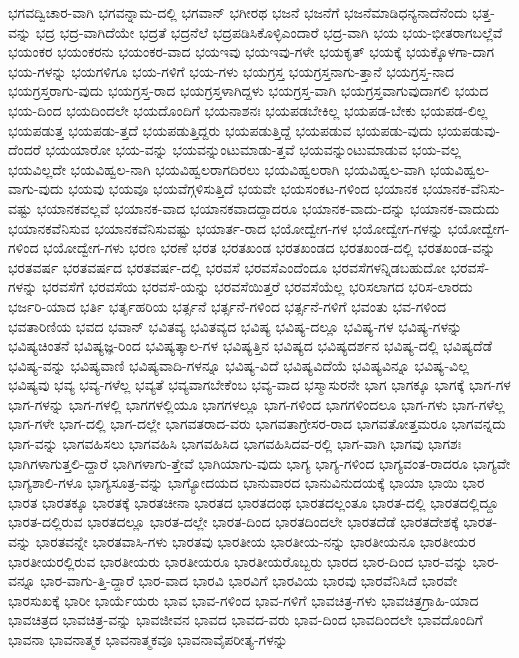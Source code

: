 {ಭಗವದ್ವಿಚಾರ-ವಾಗಿ
ಭಗವನ್ನಾಮ-ದಲ್ಲಿ
ಭಗವಾನ್
ಭಗೀರಥ
ಭಜನೆ
ಭಜನೆಗೆ
ಭಜನೆಮಾಡಿಧನ್ಯನಾದೆನೆಂದು
ಭತ್ತ-ವನ್ನು
ಭದ್ರ
ಭದ್ರ-ವಾಗಿದೆಯೇ
ಭದ್ರತೆ
ಭದ್ರನೆಲೆ
ಭದ್ರಪಡಿಸಿಕೊಳ್ಳಿಎಂದಾರೆ
ಭದ್ರ-ವಾಗಿ
ಭಯ
ಭಯ-ಭೀತರಾಗಬಲ್ಲೆವೆ
ಭಯಂಕರ
ಭಯಂಕರನು
ಭಯಂಕರ-ವಾದ
ಭಯಇವು
ಭಯಇವು-ಗಳೇ
ಭಯಕೃತ್
ಭಯಕ್ಕೆ
ಭಯಕ್ಕೊಳಗಾ-ದಾಗ
ಭಯ-ಗಳನ್ನು
ಭಯಗಳಿಗೂ
ಭಯ-ಗಳಿಗೆ
ಭಯ-ಗಳು
ಭಯಗ್ರಸ್ತ
ಭಯಗ್ರಸ್ತನಾಗು-ತ್ತಾನೆ
ಭಯಗ್ರಸ್ತ-ನಾದ
ಭಯಗ್ರಸ್ತರಾಗು-ವುದು
ಭಯಗ್ರಸ್ತ-ರಾದ
ಭಯಗ್ರಸ್ತಳಾಗಿದ್ದಳು
ಭಯಗ್ರಸ್ತ-ವಾಗಿ
ಭಯಗ್ರಸ್ತವಾಗುವುದಾಗಲಿ
ಭಯದ
ಭಯ-ದಿಂದ
ಭಯದಿಂದಲೇ
ಭಯದೊಂದಿಗೆ
ಭಯನಾಶನಃ
ಭಯಪಡಬೇಕಿಲ್ಲ
ಭಯಪಡ-ಬೇಕು
ಭಯಪಡ-ಲಿಲ್ಲ
ಭಯಪಡುತ್ತ
ಭಯಪಡು-ತ್ತದೆ
ಭಯಪಡುತ್ತಿದ್ದರು
ಭಯಪಡುತ್ತಿದ್ದೆ
ಭಯಪಡುವ
ಭಯಪಡು-ವುದು
ಭಯಪಡುವು-ದೆಂದರೆ
ಭಯಯಾರೋ
ಭಯ-ವನ್ನು
ಭಯವನ್ನುಂಟುಮಾಡು-ತ್ತವೆ
ಭಯವನ್ನುಂಟುಮಾಡುವ
ಭಯ-ವಲ್ಲ
ಭಯವಿಲ್ಲದೇ
ಭಯವಿಹ್ವಲ-ನಾಗಿ
ಭಯವಿಹ್ವಲರಾಗದಿರಲು
ಭಯವಿಹ್ವಲರಾಗಿ
ಭಯವಿಹ್ವಲ-ವಾಗಿ
ಭಯವಿಹ್ವಲ-ವಾಗು-ವುದು
ಭಯವು
ಭಯವೂ
ಭಯವೆಗ್ಗಳಿಸುತ್ತಿದೆ
ಭಯವೇ
ಭಯಸಂಕಟ-ಗಳಿಂದ
ಭಯಾನಕ
ಭಯಾನಕ-ವೆನಿಸು-ವಷ್ಟು
ಭಯಾನಕವಲ್ಲವೆ
ಭಯಾನಕ-ವಾದ
ಭಯಾನಕವಾದದ್ದಾದರೂ
ಭಯಾನಕ-ವಾದು-ದನ್ನು
ಭಯಾನಕ-ವಾದುದು
ಭಯಾನಕವೆನಿಸುವ
ಭಯಾನಕವೆನಿಸುವಷ್ಟು
ಭಯಾರ್ತ-ರಾದ
ಭಯೋದ್ವೇಗ-ಗಳ
ಭಯೋದ್ವೇಗ-ಗಳನ್ನು
ಭಯೋದ್ವೇಗ-ಗಳಿಂದ
ಭಯೋದ್ವೇಗ-ಗಳು
ಭರಣ
ಭರಣೆ
ಭರತ
ಭರತಖಂಡ
ಭರತಖಂಡದ
ಭರತಖಂಡ-ದಲ್ಲಿ
ಭರತಖಂಡ-ವನ್ನು
ಭರತವರ್ಷ
ಭರತವರ್ಷದ
ಭರತವರ್ಷ-ದಲ್ಲಿ
ಭರವಸೆ
ಭರವಸೆಎಂದೆಂದೂ
ಭರವಸೆಗಳನ್ನಿಡಬಹುದೋ
ಭರವಸೆ-ಗಳನ್ನು
ಭರವಸೆಗೆ
ಭರವಸೆಯ
ಭರವಸೆ-ಯನ್ನು
ಭರವಸೆಯಿತ್ತರೆ
ಭರವಸೆಯೆಲ್ಲ
ಭರಿಸಲಾಗದ
ಭರಿಸ-ಲಾರದು
ಭರ್ಜರಿ-ಯಾದ
ಭರ್ತಿ
ಭರ್ತೃಹರಿಯ
ಭರ್ತ್ಸನೆ
ಭರ್ತ್ಸನೆ-ಗಳಿಂದ
ಭರ್ತ್ಸನೆ-ಗಳಿಗೆ
ಭವಂತು
ಭವ-ಗಳಿಂದ
ಭವತಾರಿಣಿಯ
ಭವದ
ಭವಾನ್
ಭವಿತವ್ಯ
ಭವಿತವ್ಯದ
ಭವಿಷ್ಯ
ಭವಿಷ್ಯ-ದಲ್ಲೂ
ಭವಿಷ್ಯ-ಗಳ
ಭವಿಷ್ಯ-ಗಳನ್ನು
ಭವಿಷ್ಯಚಿಂತನೆ
ಭವಿಷ್ಯಜ್ಞ-ರಿಂದ
ಭವಿಷ್ಯತ್ಕಾಲ-ಗಳ
ಭವಿಷ್ಯತ್ತಿನ
ಭವಿಷ್ಯದ
ಭವಿಷ್ಯದರ್ಶನ
ಭವಿಷ್ಯ-ದಲ್ಲಿ
ಭವಿಷ್ಯದೆಡೆ
ಭವಿಷ್ಯ-ವನ್ನು
ಭವಿಷ್ಯವಾಣಿ
ಭವಿಷ್ಯವಾದಿ-ಗಳನ್ನೂ
ಭವಿಷ್ಯ-ವಿದೆ
ಭವಿಷ್ಯವಿದೆಯೆ
ಭವಿಷ್ಯವಿನ್ನೂ
ಭವಿಷ್ಯ-ವಿಲ್ಲ
ಭವಿಷ್ಯವು
ಭವ್ಯ
ಭವ್ಯ-ಗಳೆಲ್ಲ
ಭವ್ಯತೆ
ಭವ್ಯವಾಗಬೇಕೆಂಬ
ಭವ್ಯ-ವಾದ
ಭಸ್ಮಾಸುರನೇ
ಭಾಗ
ಭಾಗಕ್ಕೂ
ಭಾಗಕ್ಕೆ
ಭಾಗ-ಗಳ
ಭಾಗ-ಗಳನ್ನು
ಭಾಗ-ಗಳಲ್ಲಿ
ಭಾಗಗಳಲ್ಲಿಯೂ
ಭಾಗಗಳಲ್ಲೂ
ಭಾಗ-ಗಳಿಂದ
ಭಾಗಗಳಿಂದಲೂ
ಭಾಗ-ಗಳು
ಭಾಗ-ಗಳೆಲ್ಲ
ಭಾಗ-ಗಳೇ
ಭಾಗ-ದಲ್ಲಿ
ಭಾಗ-ದಲ್ಲೇ
ಭಾಗವತರಾದ-ವರು
ಭಾಗವತಾಗ್ರೇಸರ-ರಾದ
ಭಾಗವತೋತ್ತಮರೂ
ಭಾಗವನ್ನದು
ಭಾಗ-ವನ್ನು
ಭಾಗವಹಿಸಲು
ಭಾಗವಹಿಸಿ
ಭಾಗವಹಿಸಿದ
ಭಾಗವಹಿಸಿದವ-ರಲ್ಲಿ
ಭಾಗ-ವಾಗಿ
ಭಾಗವು
ಭಾಗಶಃ
ಭಾಗಿಗಳಾಗುತ್ತಲಿ-ದ್ದಾರೆ
ಭಾಗಿಗಳಾಗು-ತ್ತೇವೆ
ಭಾಗಿಯಾಗು-ವುದು
ಭಾಗ್ಯ
ಭಾಗ್ಯ-ಗಳಿಂದ
ಭಾಗ್ಯವಂತ-ರಾದರೂ
ಭಾಗ್ಯವೇ
ಭಾಗ್ಯಶಾಲಿ-ಗಳೂ
ಭಾಗ್ಯಸೂತ್ರ-ವನ್ನು
ಭಾಗ್ಯೋದಯದ
ಭಾನುವಾರದ
ಭಾನುವಿನುದಯಕ್ಕೆ
ಭಾಯಾ
ಭಾಯಿ
ಭಾರ
ಭಾರತ
ಭಾರತಕ್ಕೂ
ಭಾರತಕ್ಕೆ
ಭಾರತಚೀನಾ
ಭಾರತದ
ಭಾರತದಂಥ
ಭಾರತದಲ್ಲಂತೂ
ಭಾರತ-ದಲ್ಲಿ
ಭಾರತದಲ್ಲಿದ್ದೂ
ಭಾರತ-ದಲ್ಲಿರುವ
ಭಾರತದಲ್ಲೂ
ಭಾರತ-ದಲ್ಲೇ
ಭಾರತ-ದಿಂದ
ಭಾರತದಿಂದಲೇ
ಭಾರತದೆಡೆ
ಭಾರತದೇಶಕ್ಕೆ
ಭಾರತ-ವನ್ನು
ಭಾರತವನ್ನೇ
ಭಾರತವಾಸಿ-ಗಳು
ಭಾರತವು
ಭಾರತೀಯ
ಭಾರತೀಯ-ನನ್ನು
ಭಾರತೀಯನೂ
ಭಾರತೀಯರ
ಭಾರತೀಯರಲ್ಲಿರುವ
ಭಾರತೀಯರು
ಭಾರತೀಯರೂ
ಭಾರತೀಯರೊಬ್ಬರು
ಭಾರದ
ಭಾರ-ದಿಂದ
ಭಾರ-ವನ್ನು
ಭಾರ-ವನ್ನೂ
ಭಾರ-ವಾಗು-ತ್ತಿ-ದ್ದಾರೆ
ಭಾರ-ವಾದ
ಭಾರವಿ
ಭಾರವಿಗೆ
ಭಾರವಿಯ
ಭಾರವು
ಭಾರವೆನಿಸಿದೆ
ಭಾರವೇ
ಭಾರಸುಖಕ್ಕೆ
ಭಾರೀ
ಭಾರ್ಯೆಯರು
ಭಾವ
ಭಾವ-ಗಳಿಂದ
ಭಾವ-ಗಳಿಗೆ
ಭಾವಚಿತ್ರ-ಗಳು
ಭಾವಚಿತ್ರಗ್ರಾಹಿ-ಯಾದ
ಭಾವಚಿತ್ರದ
ಭಾವಚಿತ್ರ-ವನ್ನು
ಭಾವಜೀವನ
ಭಾವದ
ಭಾವದ-ವರು
ಭಾವ-ದಿಂದ
ಭಾವದಿಂದಲೇ
ಭಾವದೊಂದಿಗೆ
ಭಾವನಾ
ಭಾವನಾತ್ಮಕ
ಭಾವನಾತ್ಮಕವೂ
ಭಾವನಾವೈಪರೀತ್ಯ-ಗಳನ್ನು
}
